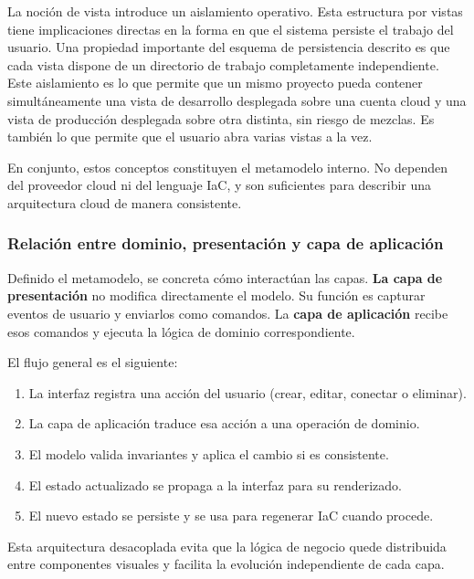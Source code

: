 \documentclass{article}
\begin{document}
{        \justify
        La noción de vista introduce un aislamiento operativo. Esta estructura por vistas
        tiene implicaciones directas en la forma en que el
        sistema persiste el trabajo del usuario. Una propiedad importante del esquema
        de persistencia descrito es que cada vista dispone de un directorio de trabajo
        completamente independiente. Este aislamiento es lo que permite que un mismo
        proyecto pueda contener simultáneamente una vista de desarrollo desplegada
        sobre una cuenta cloud y una vista de producción desplegada
        sobre otra distinta, sin riesgo de mezclas. Es también lo que
        permite que el usuario abra varias vistas a la vez.

        \justify
        En conjunto, estos conceptos constituyen el metamodelo interno. No dependen del proveedor
        cloud ni del lenguaje IaC, y son suficientes para describir una arquitectura
        cloud de manera consistente.

        \subsubsection{Relación entre dominio, presentación y capa de aplicación}
        \justify
        Definido el metamodelo, se concreta cómo interactúan las capas. \textbf{La capa de presentación}
        no modifica directamente el modelo. Su función es capturar eventos de usuario y
        enviarlos como comandos. La \textbf{capa de aplicación} recibe esos comandos y
        ejecuta la lógica de dominio correspondiente.

        \justify
        El flujo general es el siguiente:
        \begin{enumerate}
            \item La interfaz registra una acción del usuario (crear, editar, conectar o
            eliminar).
            \item La capa de aplicación traduce esa acción a una operación de dominio.
            \item El modelo valida invariantes y aplica el cambio si es consistente.
            \item El estado actualizado se propaga a la interfaz para su renderizado.
            \item El nuevo estado se persiste y se usa para regenerar IaC cuando procede.
        \end{enumerate}

        \justify
        Esta arquitectura desacoplada evita que la lógica de negocio quede distribuida entre
        componentes visuales y facilita la evolución independiente de cada capa.


}
\end{document}

